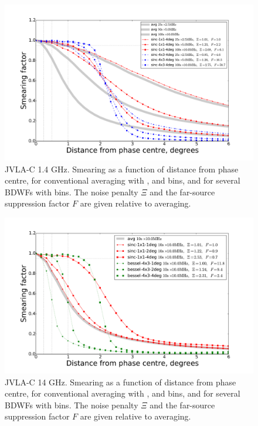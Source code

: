 \documentclass[useAMS,usenatbib]{mn2e}
\begin{document}
\begin{figure}
\includegraphics[width=.9\textwidth]{./Figures/suppression-25-100-sincs.pdf}
\caption{JVLA-C 1.4 GHz. Smearing as a function of distance from phase centre, for conventional averaging with 
,  and  bins, and for several BDWFs with  bins.
The noise penalty $\Xi$ and the far-source suppression factor $F$ are given relative to 
averaging.}
\label{fig:results-3sincs}
\end{figure}
\begin{figure}
\includegraphics[width=.9\textwidth]{./Figures/suppression-14GHz.pdf}
\caption{JVLA-C 14 GHz. Smearing as a function of distance from phase centre, for conventional averaging with 
,  and  bins, and for several BDWFs with  bins.
The noise penalty $\Xi$ and the far-source suppression factor $F$ are given relative to 
averaging.}
\label{fig:results-14ghz}
\end{figure}
\end{document}
